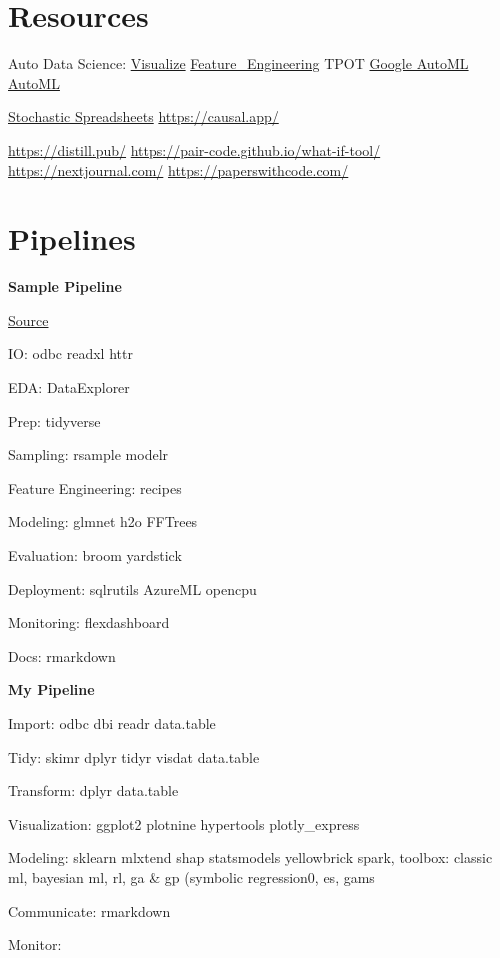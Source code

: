\documentclass[]{book}
\begin{document}
\hypertarget{resources}{%
\section{Resources}\label{resources}}

Auto Data Science: \href{http://holoviews.org}{Visualize} \href{https://www.featuretools.com}{Feature\_Engineering} TPOT \href{https://cloud.google.com/automl/}{Google AutoML} \href{https://www.automl.org/}{AutoML}

\href{https://www.getguesstimate.com/}{Stochastic Spreadsheets} \url{https://causal.app/}

\url{https://distill.pub/} \url{https://pair-code.github.io/what-if-tool/} \url{https://nextjournal.com/} \url{https://paperswithcode.com/}

\hypertarget{pipelines}{%
\section{Pipelines}\label{pipelines}}

\textbf{Sample Pipeline}

\href{https://mobile.twitter.com/TheStephLocke/status/990251709531344896}{Source}

IO: odbc readxl httr

EDA: DataExplorer

Prep: tidyverse

Sampling: rsample modelr

Feature Engineering: recipes

Modeling: glmnet h2o FFTrees

Evaluation: broom yardstick

Deployment: sqlrutils AzureML opencpu

Monitoring: flexdashboard

Docs: rmarkdown

\textbf{My Pipeline}

Import: odbc dbi readr data.table

Tidy: skimr dplyr tidyr visdat data.table

Transform: dplyr data.table

Visualization: ggplot2 plotnine hypertools plotly\_express

Modeling: sklearn mlxtend shap statsmodels yellowbrick spark, toolbox: classic ml, bayesian ml, rl, ga \& gp (symbolic regression0, es, gams

Communicate: rmarkdown

Monitor:
\end{document}
